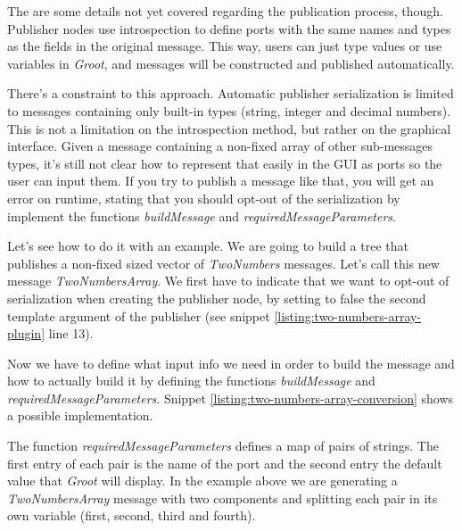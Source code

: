 \documentclass[a4paper,12pt]{article}
\begin{document}
The are some details not yet covered regarding the publication process, though. Publisher nodes use introspection to define ports with the same names and types as the fields in the original message. This way, users can just type values or use variables in \textit{Groot}, and messages will be constructed and published automatically.

There's a constraint to this approach. Automatic publisher serialization is limited to messages containing only built-in types (string, integer and decimal numbers). This is not a limitation on the introspection method, but rather on the graphical interface. Given a message containing a non-fixed array of other sub-messages types, it's still not clear how to represent that easily in the GUI as ports so the user can input them. If you try to publish a message like that, you will get an error on runtime, stating that you should opt-out of the serialization by implement the functions \textit{buildMessage} and \textit{requiredMessageParameters}.

Let's see how to do it with an example. We are going to build a tree that publishes a non-fixed sized vector of \textit{TwoNumbers} messages. Let's call this new message \textit{TwoNumbersArray}. We first have to indicate that we want to opt-out of serialization when creating the publisher node, by setting to false the second template argument of the publisher (see snippet \ref{listing:two-numbers-array-plugin} line 13).



Now we have to define what input info we need in order to build the message and how to actually build it by defining the functions \textit{buildMessage} and \textit{requiredMessageParameters}. Snippet \ref{listing:two-numbers-array-conversion} shows a possible implementation.



The function \textit{requiredMessageParameters} defines a map of pairs of strings. The first entry of each pair is the name of the port and the second entry the default value that \textit{Groot} will display. In the example above we are generating a \textit{TwoNumbersArray} message with two components and splitting each pair in its own variable (first, second, third and fourth).
\end{document}
